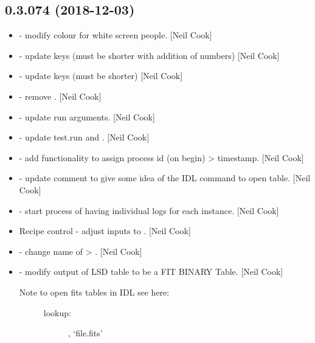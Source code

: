 \documentclass[a4paper,10pt,english]{report}
\begin{document}
\subsection{0.3.074 (2018-12-03)}
\label{\detokenize{misc/changelog:id249}}\begin{itemize}
\item {} 
 - modify colour for white screen people. {[}Neil Cook{]}

\item {} 
 - update keys (must be shorter with addition of
numbers) {[}Neil Cook{]}

\item {} 
 - update keys (must be shorter) {[}Neil Cook{]}

\item {} 
 - remove . {[}Neil Cook{]}

\item {} 
 - update run arguments. {[}Neil Cook{]}

\item {} 
 - update test.run and . {[}Neil Cook{]}

\item {} 
 - add functionality to assign process id (on begin)
\textendash{}\textgreater{} timestamp. {[}Neil Cook{]}

\item {} 
 - update comment to give some idea of the IDL command
to open table. {[}Neil Cook{]}

\item {} 
 - start process of having individual logs for each
instance. {[}Neil Cook{]}

\item {} 
Recipe control - adjust inputs to . {[}Neil Cook{]}

\item {} 
 - change name of  \textendash{}\textgreater{}
. {[}Neil Cook{]}

\item {} 
 - modify output of LSD table to be a FIT BINARY Table.
{[}Neil Cook{]}
\begin{description}
\item[{Note to open fits tables in IDL see here:}] \leavevmode
{}
\begin{description}
\item[{lookup:}] \leavevmode
{}, ‘file.fits’


\end{description}
\end{description}
\end{itemize}
\end{document}
